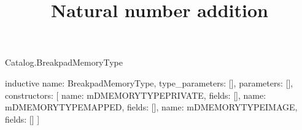 \begin{lexlean}{Catalog.BreakpadMemoryType}
\title{Natural number addition}
\begin{semanticmodule}
inductive{
  name: BreakpadMemoryType,
  type_parameters: [],
  parameters: [],
  constructors: [
    {name: mDMEMORYTYPEPRIVATE, fields: []},
    {name: mDMEMORYTYPEMAPPED, fields: []},
    {name: mDMEMORYTYPEIMAGE, fields: []}
  ]
}
\end{semanticmodule}
\end{lexlean}
